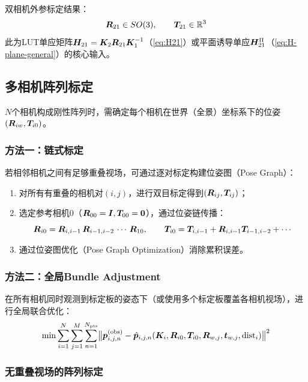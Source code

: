 \begin{finalbox}
双相机外参标定结果：
\[
\bm{R}_{21} \in SO(3),\qquad \bm{T}_{21} \in \mathbb{R}^3
\]
此为LUT单应矩阵$\bm{H}_{21} = \bm{K}_2\bm{R}_{21}\bm{K}_1^{-1}$（\cref{eq:H21}）或平面诱导单应$\bm{H}_{21}^{\Pi}$（\cref{eq:H-plane-general}）的核心输入。
\end{finalbox}

\subsection{多相机阵列标定}
\label{sec:multi-calib}

$N$个相机构成刚性阵列时，需确定每个相机在世界（全景）坐标系下的位姿$(\bm{R}_{iw}, \bm{T}_{i0})$。

\subsubsection{方法一：链式标定}

若相邻相机之间有足够重叠视场，可通过逐对标定构建位姿图（Pose Graph）：
\begin{enumerate}[leftmargin=*]
  \item 对所有有重叠的相机对$(i,j)$，进行双目标定得到$(\bm{R}_{ij}, \bm{T}_{ij})$；
  \item 选定参考相机0（$\bm{R}_{00}=\bm{I}, \bm{T}_{00}=\bm{0}$），通过位姿链传播：
  \[
  \bm{R}_{i0} = \bm{R}_{i,i-1}\,\bm{R}_{i-1,i-2}\,\cdots\,\bm{R}_{10},
  \qquad
  \bm{T}_{i0} = \bm{T}_{i,i-1} + \bm{R}_{i,i-1}\bm{T}_{i-1,i-2} + \cdots
  \]
  \item 通过位姿图优化（Pose Graph Optimization）消除累积误差。
\end{enumerate}

\subsubsection{方法二：全局Bundle Adjustment}

在所有相机同时观测到标定板的姿态下（或使用多个标定板覆盖各相机视场），进行全局联合优化：
\begin{equation}
\min \sum_{i=1}^{N}\sum_{j=1}^{M}\sum_{n=1}^{N_{\text{pts}}}
\bigl\|\bm{p}_{i,j,n}^{\text{(obs)}} - \hat{\bm{p}}_{i,j,n}(\bm{K}_i, \bm{R}_{i0}, \bm{T}_{i0}, \bm{R}_{w,j}, \bm{t}_{w,j}, \text{dist}_i)\bigr\|^2
\label{eq:global-ba}
\end{equation}

\subsubsection{无重叠视场的阵列标定}

